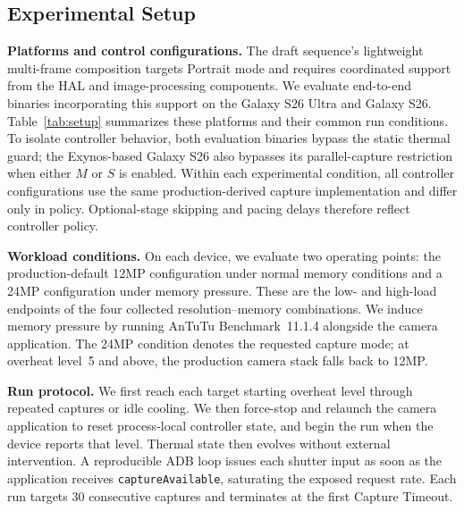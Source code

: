 \subsection{Experimental Setup}
\label{sec:setup}



\smallskip\noindent\textbf{Platforms and control configurations.}
The draft sequence's lightweight multi-frame composition targets Portrait mode and requires coordinated support from the HAL and image-processing components.
We evaluate end-to-end binaries incorporating this support on the Galaxy S26 Ultra and Galaxy S26.
Table~\ref{tab:setup} summarizes these platforms and their common run conditions.
To isolate controller behavior, both evaluation binaries bypass the static thermal guard; the Exynos-based Galaxy S26 also bypasses its parallel-capture restriction when either \(M\) or \(S\) is enabled.
Within each experimental condition, all controller configurations use the same production-derived capture implementation and differ only in policy.
Optional-stage skipping and pacing delays therefore reflect controller policy.

\smallskip\noindent\textbf{Workload conditions.}
On each device, we evaluate two operating points: the production-default 12MP configuration under normal memory conditions and a 24MP configuration under memory pressure.
These are the low- and high-load endpoints of the four collected resolution--memory combinations.
We induce memory pressure by running AnTuTu Benchmark~11.1.4 alongside the camera application.
The 24MP condition denotes the requested capture mode; at overheat level~5 and above, the production camera stack falls back to 12MP.

\smallskip\noindent\textbf{Run protocol.}
We first reach each target starting overheat level through repeated captures or idle cooling.
We then force-stop and relaunch the camera application to reset process-local controller state, and begin the run when the device reports that level.
Thermal state then evolves without external intervention.
A reproducible ADB loop issues each shutter input as soon as the application receives \texttt{captureAvailable}, saturating the exposed request rate.
Each run targets 30 consecutive captures and terminates at the first Capture Timeout.
